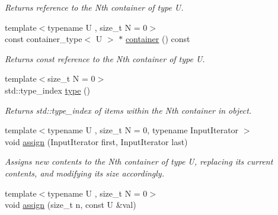 \begin{DoxyCompactItemize}
\begin{DoxyCompactList}\small\item\em Returns reference to the Nth container of type U. \end{DoxyCompactList}\item 
\hypertarget{classheterogeneous_1_1heterovector_3_01_t_00_01_types_8_8_8_4_ad3568e30a13341df67f0e21c6547a1ba}{}{\footnotesize template$<$typename U , size\+\_\+t N = 0$>$ }\\const container\+\_\+type$<$ U $>$ $\ast$ \hyperlink{classheterogeneous_1_1heterovector_3_01_t_00_01_types_8_8_8_4_ad3568e30a13341df67f0e21c6547a1ba}{container} () const \label{classheterogeneous_1_1heterovector_3_01_t_00_01_types_8_8_8_4_ad3568e30a13341df67f0e21c6547a1ba}

\begin{DoxyCompactList}\small\item\em Returns const reference to the Nth container of type U. \end{DoxyCompactList}\item 
\hypertarget{classheterogeneous_1_1heterovector_3_01_t_00_01_types_8_8_8_4_a6b2fcabd7d4725d4ab5f0b2a194ead11}{}{\footnotesize template$<$size\+\_\+t N = 0$>$ }\\std\+::type\+\_\+index \hyperlink{classheterogeneous_1_1heterovector_3_01_t_00_01_types_8_8_8_4_a6b2fcabd7d4725d4ab5f0b2a194ead11}{type} ()\label{classheterogeneous_1_1heterovector_3_01_t_00_01_types_8_8_8_4_a6b2fcabd7d4725d4ab5f0b2a194ead11}

\begin{DoxyCompactList}\small\item\em Returns std\+::type\+\_\+index of items within the Nth container in object. \end{DoxyCompactList}\item 
\hypertarget{classheterogeneous_1_1heterovector_3_01_t_00_01_types_8_8_8_4_ad8ecf7f7ca4b92b225a882e3445bdda5}{}{\footnotesize template$<$typename U , size\+\_\+t N = 0, typename Input\+Iterator $>$ }\\void \hyperlink{classheterogeneous_1_1heterovector_3_01_t_00_01_types_8_8_8_4_ad8ecf7f7ca4b92b225a882e3445bdda5}{assign} (Input\+Iterator first, Input\+Iterator last)\label{classheterogeneous_1_1heterovector_3_01_t_00_01_types_8_8_8_4_ad8ecf7f7ca4b92b225a882e3445bdda5}

\begin{DoxyCompactList}\small\item\em Assigns new contents to the Nth container of type U, replacing its current contents, and modifying its size accordingly. \end{DoxyCompactList}\item 
\hypertarget{classheterogeneous_1_1heterovector_3_01_t_00_01_types_8_8_8_4_a3968877993cbf8df47744807220fd1ee}{}{\footnotesize template$<$typename U , size\+\_\+t N = 0$>$ }\\void \hyperlink{classheterogeneous_1_1heterovector_3_01_t_00_01_types_8_8_8_4_a3968877993cbf8df47744807220fd1ee}{assign} (size\+\_\+t n, const U \&val)\label{classheterogeneous_1_1heterovector_3_01_t_00_01_types_8_8_8_4_a3968877993cbf8df47744807220fd1ee}


\end{DoxyCompactItemize}
